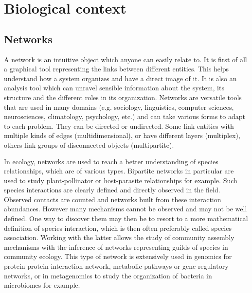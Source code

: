 %
%

  \section*{Biological context}
 \subsection*{Networks}
 A network is an intuitive object which anyone can easily relate to. It is first of all a graphical tool representing the links between different entities. This helps understand how a system organizes and have a direct image of it. It is also an analysis tool which can unravel sensible information about the system, its structure and the different roles in its organization. Networks are versatile tools that are  used in many domains (e.g. sociology, linguistics, computer sciences, neurosciences, climatology, psychology, etc.) and can take various forms to adapt to each problem.  They can be directed or undirected. Some link entities with multiple kinds of edges (multidimensional), or have different layers (multiplex), others link groups of disconnected objects (multipartite). 

 In ecology, networks are used to reach a better understanding of species relationships, which are of various types. Bipartite networks in particular are used to study plant-pollinator or host-parasite relationships for example. Such species interactions are clearly defined and directly observed in the field. Observed contacts are counted and networks built from these interaction abundances. However many mechanisms cannot be observed and may not be well defined. One way to discover them may then be to resort to a more mathematical definition of species interaction, which is then often preferably called species association. Working with the latter allows the study of community assembly mechanisms with the inference of networks representing guilds of species in community ecology. This type of network is extensively used in genomics for protein-protein interaction network, metabolic pathways or gene regulatory networks, or in metagenomics to study the organization of bacteria in microbiomes for example.
 
